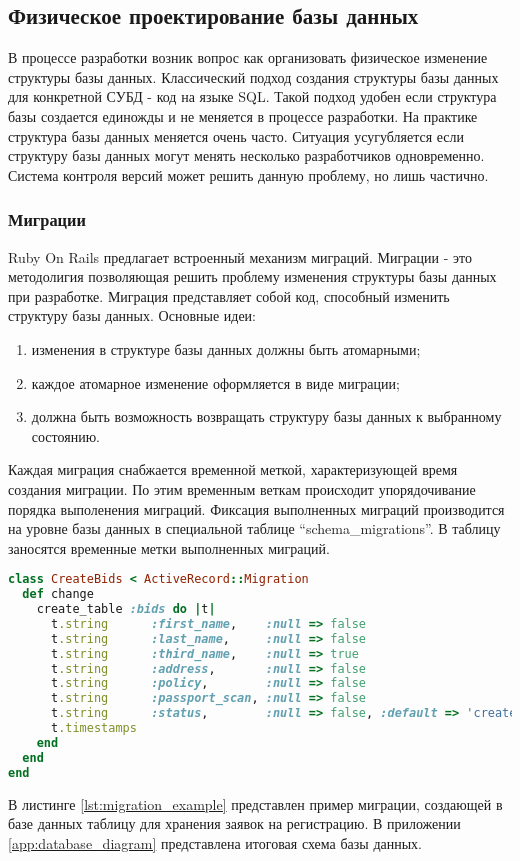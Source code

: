 \subsection{Физическое проектирование базы данных}
В процессе разработки возник вопрос как организовать физическое изменение
структуры базы данных. Классический подход создания структуры базы данных для
конкретной СУБД - код на языке SQL. Такой подход удобен если структура базы
создается единожды и не меняется в процессе разработки. На практике структура
базы данных меняется очень часто. Ситуация усугубляется если структуру базы
данных могут менять несколько разработчиков одновременно. Система контроля
версий может решить данную проблему, но лишь частично.

\subsubsection{Миграции}
Ruby On Rails предлагает встроенный механизм миграций. Миграции - это
методолигия позволяющая решить проблему изменения структуры базы данных при
разработке. Миграция представляет собой код, способный изменить структуру базы
данных.
Основные идеи:
\begin{enumerate}
  \item изменения в структуре базы данных должны быть атомарными;
  \item каждое атомарное изменение оформляется в виде миграции;
  \item должна быть возможность возвращать структуру базы данных к выбранному
состоянию.
\end{enumerate}

Каждая миграция снабжается временной меткой, характеризующей время создания
миграции. По этим временным веткам происходит упорядочивание порядка выполенения
миграций. Фиксация выполненных миграций производится на уровне базы данных в
специальной таблице “schema\_migrations”. В таблицу заносятся временные метки
выполненных миграций.

\begin{lstlisting}[language=Ruby,caption=Пример миграций
,label={lst:migration_example}] 
class CreateBids < ActiveRecord::Migration
  def change
    create_table :bids do |t|
      t.string      :first_name,    :null => false
      t.string      :last_name,     :null => false
      t.string      :third_name,    :null => true
      t.string      :address,       :null => false
      t.string      :policy,        :null => false
      t.string      :passport_scan, :null => false
      t.string      :status,        :null => false, :default => 'created'
      t.timestamps
    end
  end
end
\end{lstlisting}

В листинге \ref{lst:migration_example} представлен пример миграции, создающей в
базе данных таблицу для хранения заявок на регистрацию.
В приложении \ref{app:database_diagram} представлена итоговая схема базы данных.
